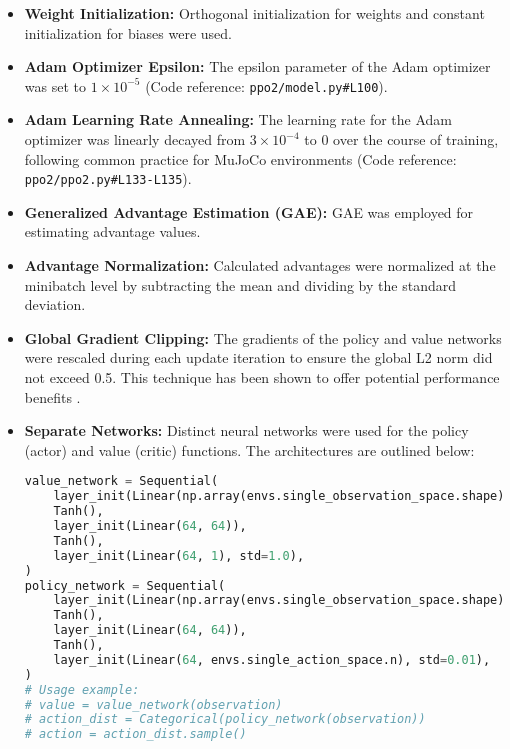 \documentclass{article}
\begin{document}
\begin{itemize}
    \item \textbf{Weight Initialization:} Orthogonal initialization for weights and constant initialization for biases were used.
    \item \textbf{Adam Optimizer Epsilon:} The epsilon parameter of the Adam optimizer was set to \(1 \times 10^{-5}\) (Code reference: \texttt{ppo2/model.py\#L100}).
    \item \textbf{Adam Learning Rate Annealing:} The learning rate for the Adam optimizer was linearly decayed from \(3 \times 10^{-4}\) to 0 over the course of training, following common practice for MuJoCo environments (Code reference: \texttt{ppo2/ppo2.py\#L133-L135}).
    \item \textbf{Generalized Advantage Estimation (GAE):} GAE was employed for estimating advantage values.
    \item \textbf{Advantage Normalization:} Calculated advantages were normalized at the minibatch level by subtracting the mean and dividing by the standard deviation.
    \item \textbf{Global Gradient Clipping:} The gradients of the policy and value networks were rescaled during each update iteration to ensure the global L2 norm did not exceed 0.5. This technique has been shown to offer potential performance benefits \cite{andrychowicz2021what}.
    \item \textbf{Separate Networks:} Distinct neural networks were used for the policy (actor) and value (critic) functions. The architectures are outlined below:
    \begin{lstlisting}[language=Python]
value_network = Sequential(
    layer_init(Linear(np.array(envs.single_observation_space.shape).prod(), 64)),
    Tanh(),
    layer_init(Linear(64, 64)),
    Tanh(),
    layer_init(Linear(64, 1), std=1.0),
)
policy_network = Sequential(
    layer_init(Linear(np.array(envs.single_observation_space.shape).prod(), 64)),
    Tanh(),
    layer_init(Linear(64, 64)),
    Tanh(),
    layer_init(Linear(64, envs.single_action_space.n), std=0.01),
)
# Usage example:
# value = value_network(observation)
# action_dist = Categorical(policy_network(observation))
# action = action_dist.sample()
    \end{lstlisting}
\end{itemize}
\end{document}
